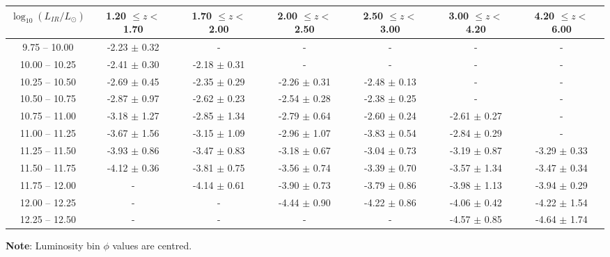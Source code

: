 \begin{table*}
\begin{center}
\begin{tabular}{@{}ccccccc@{}}
        \hline
        $\log_{10}(L_{IR}/L_{\odot})$ & 1.20 $\leq z <$ 1.70 & 1.70 $\leq z <$ 2.00 & 2.00 $\leq z <$ 2.50 & 2.50 $\leq z <$ 3.00 & 3.00 $\leq z <$ 4.20 & 4.20 $\leq z <$ 6.00  \\
        \hline
         9.75 -- 10.00 & -2.23 $\pm$ 0.32 & -                & -                & -                & -                & - \\
        10.00 -- 10.25 & -2.41 $\pm$ 0.30 & -2.18 $\pm$ 0.31 & -                & -                & -                & - \\
        10.25 -- 10.50 & -2.69 $\pm$ 0.45 & -2.35 $\pm$ 0.29 & -2.26 $\pm$ 0.31 & -2.48 $\pm$ 0.13 & -                & - \\
        10.50 -- 10.75 & -2.87 $\pm$ 0.97 & -2.62 $\pm$ 0.23 & -2.54 $\pm$ 0.28 & -2.38 $\pm$ 0.25 & -                & - \\
        10.75 -- 11.00 & -3.18 $\pm$ 1.27 & -2.85 $\pm$ 1.34 & -2.79 $\pm$ 0.64 & -2.60 $\pm$ 0.24 & -2.61 $\pm$ 0.27 & - \\
        11.00 -- 11.25 & -3.67 $\pm$ 1.56 & -3.15 $\pm$ 1.09 & -2.96 $\pm$ 1.07 & -3.83 $\pm$ 0.54 & -2.84 $\pm$ 0.29 & - \\
        11.25 -- 11.50 & -3.93 $\pm$ 0.86 & -3.47 $\pm$ 0.83 & -3.18 $\pm$ 0.67 & -3.04 $\pm$ 0.73 & -3.19 $\pm$ 0.87 & -3.29 $\pm$ 0.33 \\
        11.50 -- 11.75 & -4.12 $\pm$ 0.36 & -3.81 $\pm$ 0.75 & -3.56 $\pm$ 0.74 & -3.39 $\pm$ 0.70 & -3.57 $\pm$ 1.34 & -3.47 $\pm$ 0.34 \\
        11.75 -- 12.00 & -                & -4.14 $\pm$ 0.61 & -3.90 $\pm$ 0.73 & -3.79 $\pm$ 0.86 & -3.98 $\pm$ 1.13 & -3.94 $\pm$ 0.29 \\
        12.00 -- 12.25 & -                & -                & -4.44 $\pm$ 0.90 & -4.22 $\pm$ 0.86 & -4.06 $\pm$ 0.42 & -4.22 $\pm$ 1.54 \\
        12.25 -- 12.50 & -                & -                & -                & -                & -4.57 $\pm$ 0.85 & -4.64 $\pm$ 1.74
        \botrule
    \end{tabular}
    \end{center}
    \begin{tabnote}
        {\textbf{Note}: Luminosity bin $\phi$ values are centred.}\tnp
    \end{tabnote}
\end{table*}

